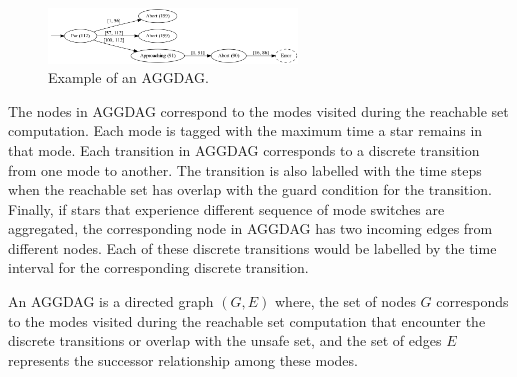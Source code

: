 
\begin{figure}
\includegraphics[width=0.59\textwidth]{images/viz2}
\caption{Example of an AGGDAG.}
\label{fig:aggdagex1}
\end{figure}
%
%
The nodes in AGGDAG correspond to the modes visited during the reachable set computation. Each mode is tagged with the maximum time a star remains in that mode. Each transition in AGGDAG corresponds to a discrete transition from one mode to another. The transition is also labelled with the time steps when the reachable set has overlap with the guard condition for the transition. Finally, if stars that experience different sequence of mode switches are aggregated, the corresponding node in AGGDAG has two incoming edges from different nodes. Each of these discrete transitions would be labelled by the time interval for the corresponding discrete transition.

\begin{definition}
\label{def:aggdag}
An AGGDAG is a directed graph $(G, E)$ where, the set of nodes $G$ corresponds to the modes visited during the reachable set computation that encounter the discrete transitions or overlap with the unsafe set, and the set of edges $E$ represents the successor relationship among these modes.
\end{definition}



